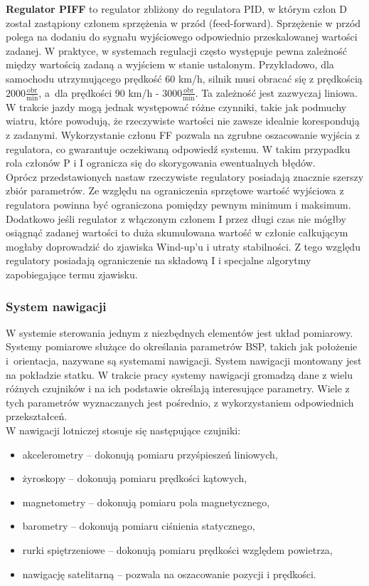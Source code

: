 \textbf{Regulator PIFF} to regulator zbliżony do regulatora PID, w którym człon D został zastąpiony członem sprzężenia w przód (feed-forward). Sprzężenie w przód polega na dodaniu do sygnału wyjściowego odpowiednio przeskalowanej wartości zadanej. W praktyce, w systemach regulacji często występuje pewna zależność między wartością zadaną a wyjściem w stanie ustalonym. Przykładowo, dla samochodu utrzymującego prędkość 60 km/h, silnik musi obracać się z prędkością $2000 \frac{\text{obr}}{\text{min}}$, a~dla prędkości 90 km/h - $3000 \frac{\text{obr}}{\text{min}}$. Ta zależność jest zazwyczaj liniowa. W trakcie jazdy mogą jednak występować różne czynniki, takie jak podmuchy wiatru, które powodują, że rzeczywiste wartości nie zawsze idealnie korespondują z zadanymi. Wykorzystanie członu FF pozwala na zgrubne oszacowanie wyjścia z regulatora, co gwarantuje oczekiwaną odpowiedź systemu. W takim przypadku rola członów P i I ogranicza się do skorygowania ewentualnych błędów. \\

Oprócz przedstawionych nastaw rzeczywiste regulatory posiadają znacznie szerszy zbiór parametrów. Ze względu na ograniczenia sprzętowe wartość wyjściowa z regulatora powinna być ograniczona pomiędzy pewnym minimum i maksimum. Dodatkowo jeśli regulator z włączonym członem I przez długi czas nie mógłby osiągnąć zadanej wartości to duża skumulowana wartość w członie całkującym mogłaby doprowadzić do zjawiska Wind-up'u i utraty stabilności. Z tego względu regulatory posiadają ograniczenie na składową I i specjalne algorytmy zapobiegające termu zjawisku. 

\subsubsection{System nawigacji}

W systemie sterowania jednym z niezbędnych elementów jest układ pomiarowy. Systemy pomiarowe służące do określania parametrów BSP, takich jak położenie i~orientacja, nazywane są systemami nawigacji. System nawigacji montowany jest na pokładzie statku. W trakcie pracy systemy nawigacji gromadzą dane z wielu różnych czujników i na ich podstawie określają interesujące parametry. Wiele z tych parametrów wyznaczanych jest pośrednio, z wykorzystaniem odpowiednich przekształceń.\\

W nawigacji lotniczej stosuje się następujące czujniki:
\begin{itemize}
  \item akcelerometry -- dokonują pomiaru przyśpieszeń liniowych,
  \item żyroskopy -- dokonują pomiaru prędkości kątowych,
  \item magnetometry -- dokonują pomiaru pola magnetycznego,
  \item barometry -- dokonują pomiaru ciśnienia statycznego,
  \item rurki spiętrzeniowe -- dokonują pomiaru prędkości względem powietrza,
  \item nawigację satelitarną -- pozwala na oszacowanie pozycji i prędkości.
\end{itemize}

